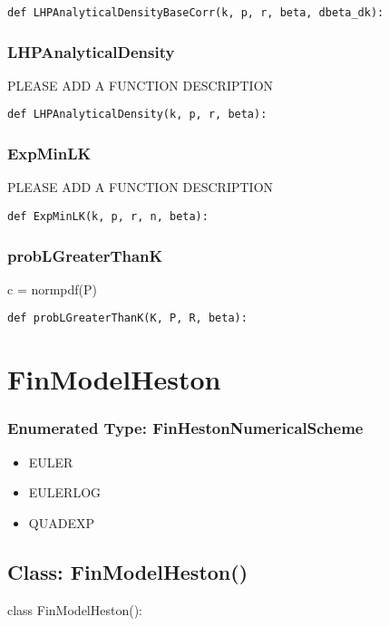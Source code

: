\documentclass[twoside,11pt]{book}
\begin{document}
\begin{lstlisting}
def LHPAnalyticalDensityBaseCorr(k, p, r, beta, dbeta_dk):
\end{lstlisting}

\subsubsection*{{\bf LHPAnalyticalDensity}}
PLEASE ADD A FUNCTION DESCRIPTION

\begin{lstlisting}
def LHPAnalyticalDensity(k, p, r, beta):
\end{lstlisting}

\subsubsection*{{\bf ExpMinLK}}
PLEASE ADD A FUNCTION DESCRIPTION

\begin{lstlisting}
def ExpMinLK(k, p, r, n, beta):
\end{lstlisting}

\subsubsection*{{\bf probLGreaterThanK}}
c = normpdf(P) 

\begin{lstlisting}
def probLGreaterThanK(K, P, R, beta):
\end{lstlisting}

\newpage
\section{FinModelHeston}

\subsubsection{Enumerated Type: FinHestonNumericalScheme}
\begin{itemize}
\item{EULER}
\item{EULERLOG}
\item{QUADEXP}
\end{itemize}

\subsection*{Class: FinModelHeston()}
class FinModelHeston(): 
\end{document}
